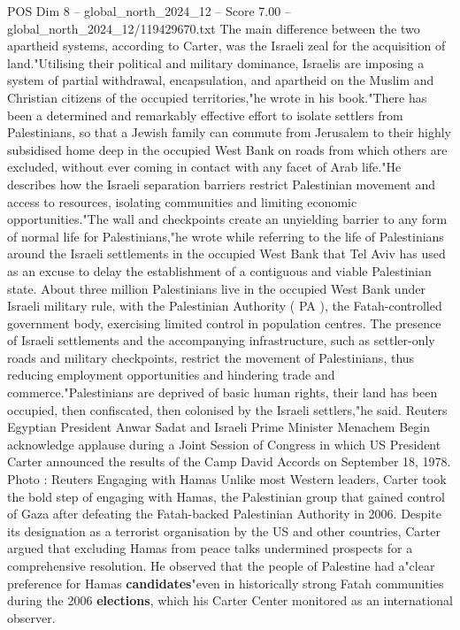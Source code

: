 \begin{textsample}{POS Dim 8 – global\_north\_2024\_12 – Score 7.00 – global\_north\_2024\_12/119429670.txt}
The main difference between the two apartheid systems, according to Carter, was the Israeli zeal for the acquisition of land."Utilising their political and military dominance, Israelis are imposing a system of partial withdrawal, encapsulation, and apartheid on the Muslim and Christian citizens of the occupied territories,"he wrote in his book."There has been a determined and remarkably effective effort to isolate settlers from Palestinians, so that a Jewish family can commute from Jerusalem to their highly subsidised home deep in the occupied West Bank on roads from which others are excluded, without ever coming in contact with any facet of Arab life."He describes how the Israeli separation barriers restrict Palestinian movement and access to resources, isolating communities and limiting economic opportunities."The wall and checkpoints create an unyielding barrier to any form of normal life for Palestinians,"he wrote while referring to the life of Palestinians around the Israeli settlements in the occupied West Bank that Tel Aviv has used as an excuse to delay the establishment of a contiguous and viable Palestinian state.
About three million Palestinians live in the occupied West Bank under Israeli military rule, with the Palestinian Authority ( PA ), the Fatah-controlled government body, exercising limited control in population centres.
The presence of Israeli settlements and the accompanying infrastructure, such as settler-only roads and military checkpoints, restrict the movement of Palestinians, thus reducing employment opportunities and hindering trade and commerce."Palestinians are deprived of basic human rights, their land has been occupied, then confiscated, then colonised by the Israeli settlers,"he said.
Reuters Egyptian President Anwar Sadat and Israeli Prime Minister Menachem Begin acknowledge applause during a Joint Session of Congress in which US President Carter announced the results of the Camp David Accords on September 18, 1978.
Photo : Reuters Engaging with Hamas Unlike most Western leaders, Carter took the bold step of engaging with Hamas, the Palestinian group that gained control of Gaza after defeating the Fatah-backed Palestinian Authority in 2006.
Despite its designation as a terrorist organisation by the US and other countries, Carter argued that excluding Hamas from peace talks undermined prospects for a comprehensive resolution.
He observed that the people of Palestine had a"clear preference for Hamas \textbf{candidates}"even in historically strong Fatah communities during the 2006 \textbf{elections}, which his Carter Center monitored as an international observer.

\end{textsample}
